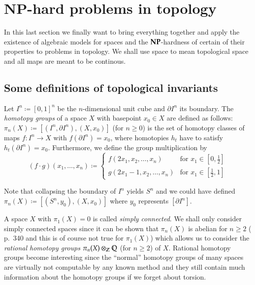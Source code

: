 \section{NP-hard problems in topology}

In this last section we finally want to bring everything together and apply the existence of algebraic
models for spaces and the $\mathbf{NP}$-hardness of certain of their properties to problems in topology.
We shall use space to mean topological space and all maps are meant to be continous.

\subsection{Some definitions of topological invariants}


\begin{Definition}
 Let $I^n \coloneqq [0,1]^n$ be the $n$-dimensional unit cube and $\partial I^n$ its boundary.
 The \emph{homotopy groups} of a space $X$ with basepoint $x_0 \in X$ are defined as follows: \newline
 $\pi_n(X) \coloneqq [(I^n, \partial I^n), (X,x_0) ]$ (for $n \geq 0$) is the set of homotopy classes of maps
 $f \colon I^n \to X$ with $f(\partial I^n) = x_0$, where homotopies $h_t$ have to satisfy $h_t(\partial I^n) = x_0$.
 Furthermore, we define the group multiplication by 
 $$ (f \cdot g) (x_1, \ldots, x_n) \coloneqq 
 \begin{cases}
  f(2x_1, x_2, \ldots, x_n) &\text{for $x_1 \in [0, \frac{1}{2}]$} \\
 
  g(2x_1 - 1, x_2, \ldots, x_n) &\text{for $x_1 \in [ \frac{1}{2}, 1]$}
 \end{cases}
$$
\end{Definition}

Note that collapsing the boundary of $I^n$ yields $S^n$ and we could have defined 
$\pi_n(X) \coloneqq [ (S^n, y_0), (X,x_0)]$ where $y_0$ represents $[\partial I^n]$.

\begin{Remark}
 A space $X$ with $\pi_1(X) = 0$ is called \emph{simply connected}. We shall only consider
 simply connected spaces since it can be shown that $\pi_n (X)$ is abelian for $n \geq 2$ 
 (\cite{SWB-334616069} p.\ 340 and this is of course not true for $\pi_1(X)$)
 which allows us to consider the \emph{rational homotopy groups}
 $ \pi_n(X) \otimes_{\mathbb{Z}} \mathbb{Q}$ (for $n \geq 2$) of $X$. Rational homotopy groups become interesting since the ``normal''
 homotopy groups of many spaces are virtually not computable by any known method and they still contain much information
 about the homotopy groups if we forget about torsion.
\end{Remark}

